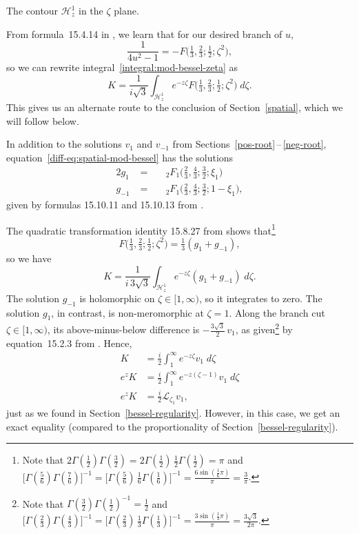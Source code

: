 \documentclass{article}
\newcommand{\laplace}{\mathcal{L}}
\theoremstyle{definition}
\theoremstyle{plain}
\newenvironment{old}{\color{RoyalBlue}}{\color{black}}
\begin{document}
\begin{old}
\begin{center}
{\small The contour $\mathcal{H}^1_z$ in the $\zeta$ plane.}
\end{center}
From formula~15.4.14 in \cite{dlmf}, we learn that for our desired branch of $u$,
\[ \frac{1}{4u^2 - 1} = -F\big(\tfrac{1}{3}, \tfrac{2}{3}; \tfrac{1}{2}; \zeta^2\big), \]
so we can rewrite integral~\eqref{integral:mod-bessel-zeta} as
\[ K = \frac{1}{i\sqrt{3}} \int_{\mathcal{H}^1_z} e^{-z\zeta} F\big(\tfrac{1}{3}, \tfrac{2}{3}; \tfrac{1}{2}; \zeta^2\big)\;d\zeta. \]
This gives us an alternate route to the conclusion of Section~\ref{spatial}, which we will follow below.

In addition to the solutions $v_1$ and $v_{-1}$ from Sections~\ref{pos-root}\,--\,\ref{neg-root}, equation~\eqref{diff-eq:spatial-mod-bessel} has the solutions
\begin{alignat*}{2}
g_1 &\;=\;& & {}_2F_1\big(\tfrac{2}{3}, \tfrac{4}{3}; \tfrac{3}{2}; \xi_1\big) \\
g_{-1} &\;=\;&  & {}_2F_1\big(\tfrac{2}{3}, \tfrac{4}{3}; \tfrac{3}{2}; 1-\xi_1\big),
\end{alignat*}
given by formulas 15.10.11 and 15.10.13 from \cite{dlmf}.

The quadratic transformation identity 15.8.27 from \cite{dlmf} shows that\footnote{Note that $2\Gamma(\tfrac{1}{2})\Gamma(\tfrac{3}{2}) = 2\Gamma(\tfrac{1}{2})\,\tfrac{1}{2}\Gamma(\tfrac{1}{2}) = \pi$ and $\big[\Gamma(\tfrac{5}{6})\Gamma(\tfrac{7}{6})\big]^{-1} = \big[\Gamma(\tfrac{5}{6})\,\tfrac{1}{6}\Gamma(\tfrac{1}{6})\big]^{-1} = \frac{6\sin(\tfrac{1}{6} \pi)}{\pi} = \frac{3}{\pi}$.}
\[ F\big(\tfrac{1}{3}, \tfrac{2}{3}; \tfrac{1}{2}; \zeta^2\big) = \tfrac{1}{3}(g_1 + g_{-1}), \]
so we have
\[ K = \frac{1}{i\,3\sqrt{3}} \int_{\mathcal{H}^1_z} e^{-z\zeta} (g_1 + g_{-1})\;d\zeta. \]
The solution $g_{-1}$ is holomorphic on $\zeta \in [1, \infty)$, so it integrates to zero. The solution $g_1$, in contrast, is non-meromorphic at $\zeta = 1$. Along the branch cut $\zeta \in [1, \infty)$, its above-minus-below difference is $-\tfrac{3\sqrt{3}}{2}\,v_1$,
as given\footnote{Note that $\Gamma(\tfrac{3}{2}) \Gamma(\tfrac{1}{2})^{-1} = \tfrac{1}{2}$ and $\big[\Gamma(\tfrac{2}{3})\Gamma(\tfrac{4}{3})\big]^{-1} = \big[\Gamma(\tfrac{2}{3})\,\tfrac{1}{3}\Gamma(\tfrac{1}{3})\big]^{-1} = \frac{3\sin(\tfrac{1}{3} \pi)}{\pi} = \frac{3\sqrt{3}}{2\pi}$.} by equation~15.2.3 from \cite{dlmf}.
Hence,
\begin{align*}
K & = \frac{i}{2} \int^\infty_1 e^{-z\zeta} v_1\;d\zeta \\
e^z K & = \frac{i}{2} \int^\infty_1 e^{-z(\zeta - 1)} v_1\;d\zeta \\
e^z K & = \tfrac{i}{2} \laplace_{\zeta_1} v_1,
\end{align*}
just as we found in Section~\ref{bessel-regularity}. However, in this case, we get an exact equality (compared to the proportionality of Section~\ref{bessel-regularity}). 

\end{old}
\end{document}
